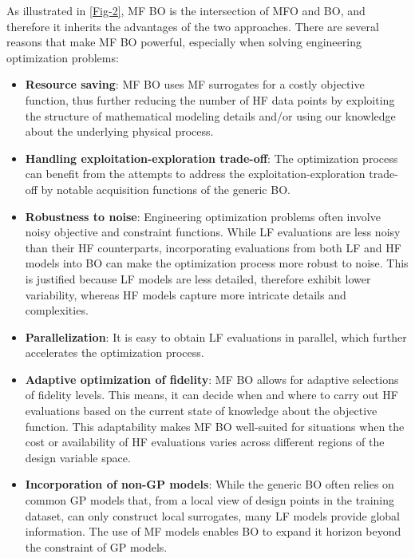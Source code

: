 \documentclass[journal ]{new-aiaa}
\begin{document}
As illustrated in \cref{Fig-2}, MF BO is the intersection of MFO and BO, and therefore it inherits the advantages of the two approaches.
There are several reasons that make MF BO powerful, especially when solving engineering optimization problems:
\begin{itemize}
	\item \textbf{Resource saving}: MF BO uses MF surrogates for a costly objective function, thus further reducing the number of HF data points by exploiting the structure of mathematical modeling details and/or using our knowledge about the underlying physical process.
	
	\item \textbf{Handling exploitation-exploration trade-off}: The optimization process can benefit from the attempts to address the exploitation-exploration trade-off by notable acquisition functions of the generic BO.
	
	\item \textbf{Robustness to noise}: Engineering optimization problems often involve noisy objective and constraint functions.
	While LF evaluations are less noisy than their HF counterparts, incorporating evaluations from both LF and HF models into BO can make the optimization process more robust to noise.
	This is justified because LF models are less detailed, therefore exhibit lower variability, whereas HF models capture more intricate details and complexities.
	
	\item \textbf{Parallelization}: It is easy to obtain LF evaluations in parallel, which further accelerates the optimization process.
	
	\item \textbf{Adaptive optimization of fidelity}: MF BO allows for adaptive selections of fidelity levels.
	This means, it can decide when and where to carry out HF evaluations based on the current state of knowledge about the objective function.
	This adaptability makes MF BO well-suited for situations when the cost or availability of HF evaluations varies across different regions of the design variable space.
	
	\item \textbf{Incorporation of non-GP models}: While the generic BO often relies on common GP models that, from a local view of design points in the training dataset, can only construct local surrogates, many LF models provide global information.
	The use of MF models enables BO to expand it horizon beyond the constraint of GP models.
	
\end{itemize}
\end{document}
